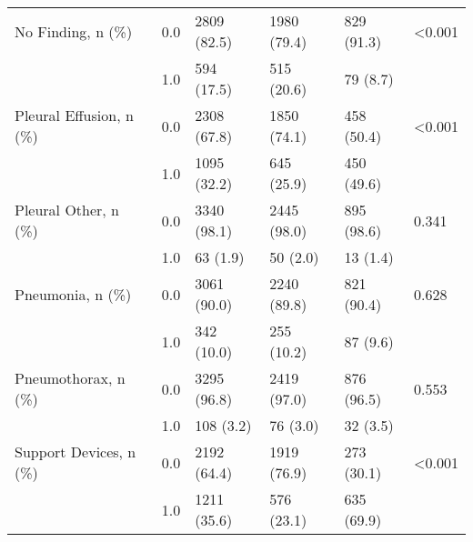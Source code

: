\begin{tabular}{llllll}
No Finding, n (\%) & 0.0 &             2809 (82.5) &  1980 (79.4) &  829 (91.3) &  <0.001 \\
                       & 1.0 &              594 (17.5) &   515 (20.6) &    79 (8.7) &         \\
Pleural Effusion, n (\%) & 0.0 &             2308 (67.8) &  1850 (74.1) &  458 (50.4) &  <0.001 \\
                       & 1.0 &             1095 (32.2) &   645 (25.9) &  450 (49.6) &         \\
Pleural Other, n (\%) & 0.0 &             3340 (98.1) &  2445 (98.0) &  895 (98.6) &   0.341 \\
                       & 1.0 &                63 (1.9) &     50 (2.0) &    13 (1.4) &         \\
Pneumonia, n (\%) & 0.0 &             3061 (90.0) &  2240 (89.8) &  821 (90.4) &   0.628 \\
                       & 1.0 &              342 (10.0) &   255 (10.2) &    87 (9.6) &         \\
Pneumothorax, n (\%) & 0.0 &             3295 (96.8) &  2419 (97.0) &  876 (96.5) &   0.553 \\
                       & 1.0 &               108 (3.2) &     76 (3.0) &    32 (3.5) &         \\
Support Devices, n (\%) & 0.0 &             2192 (64.4) &  1919 (76.9) &  273 (30.1) &  <0.001 \\
                       & 1.0 &             1211 (35.6) &   576 (23.1) &  635 (69.9) &         \\
\bottomrule
\end{tabular}
